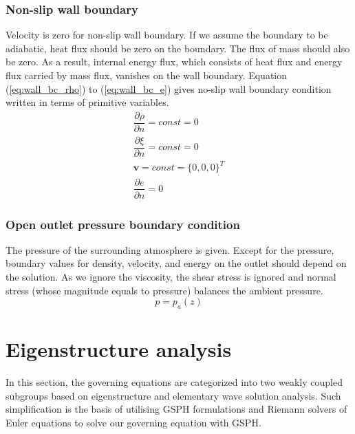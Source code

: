 \subsubsection{Non-slip wall boundary}
Velocity is zero for non-slip wall boundary. If we assume the boundary to be adiabatic, heat flux should be zero on the boundary. The flux of mass should also be zero. As a result, internal energy flux, which consists of heat flux and energy flux carried by mass flux, vanishes on the wall boundary. Equation (\ref{eq:wall_bc_rho}) to (\ref{eq:wall_bc_e}) gives no-slip wall boundary condition written in terms of primitive variables.
\begin{align}
\dfrac{\partial \rho}{\partial n} = const = 0\label{eq:wall_bc_rho} \\
\dfrac{\partial \xi}{\partial n} = const = 0 \label{eq:wall_bc_xi}\\ 
\textbf{v} = const =\{0,0,0\}^T \label{eq:wall_bc_v}\\
\dfrac{\partial e }{\partial n} = 0\label{eq:wall_bc_e}
\end{align} 

\subsubsection{Open outlet pressure boundary condition}
The pressure of the surrounding atmosphere is given. Except for the pressure, boundary values for density, velocity, and energy on the outlet should depend on the solution. As we ignore the viscosity, the shear stress is ignored and normal stress (whose magnitude equals to pressure) balances the ambient pressure.
\begin{equation}
p = p_a\left(z\right)  \label{eq:pressure_bc_p} 
\end{equation}

\section{Eigenstructure analysis}
In this section, the governing equations are categorized into two weakly coupled subgroups based on eigenstructure and elementary wave solution analysis. Such simplification is the basis of utilising GSPH formulations and Riemann solvers of Euler equations to solve our governing equation with GSPH.

